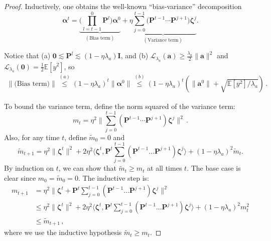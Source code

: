 \documentclass[11pt]{article}
\newcommand{\E}{\mathbb{E}}
\newcommand{\<}{\langle}
\renewcommand{\>}{\rangle}
\def\bzero{{\boldsymbol 0}}
\theoremstyle{definition}
\def\bI{{\boldsymbol I}}
\def\bP{{\boldsymbol P}}
\def\ba{{\boldsymbol a}}
\def\cL{{\mathcal L}}
\def\ba{{\boldsymbol a}}
\def\bP{{\boldsymbol P}}
\def\bzeta{{\boldsymbol \zeta}}
\def\balpha{{\boldsymbol \alpha}}
\begin{document}
\begin{proof}
Inductively, one obtains the well-known ``bias-variance'' decomposition $$\balpha^t = \underbrace{\Big(\prod_{l=t-1}^{0} \bP^l\Big) \balpha^0}_{(\mbox{Bias term})} + \underbrace{\eta \sum_{j=0}^{t-1} \Big(\bP^{t-1} \cdots \bP^{j+1} \Big) \bzeta^j}_{(\mbox{Variance term})}.$$

Notice that (a) $\bzero \lesssim \bP^l \lesssim (1 - \eta \lambda_a) \bI$, and (b) $\cL_{\lambda_a}(\ba) \geq \frac{\lambda_a}{2} \|\ba\|^2$ and $\cL_{\lambda_a}(\bzero) = \frac{1}{2} \E[y^2]$, so
\begin{align}\label{eq:bias-term-bound}
\|\mbox{(Bias term)}\| \stackrel{(a)}{\leq} (1 - \eta\lambda_a)^t \|\balpha^0\| \stackrel{(b)}{\leq} (1-\eta\lambda_a)^t(\|\ba^0\| + \sqrt{\E[y^2] / \lambda_a})\,.
\end{align}

To bound the variance term, define the norm squared of the variance term:
$$m_t = \eta^2\Big\|\sum_{j=0}^{t-1} \left(\bP^{t-1} \cdots \bP^{j+1} \right) \bzeta^j\Big\|^2\,.$$
Also, for any time $t$, define $\tilde{m}_0 = 0$ and $$\tilde{m}_{t+1} = \eta^2 \|\bzeta^t\|^2 + 2 \eta^2 \Big\<\bzeta^t, \bP^t \sum_{j=0}^{t-1} (\bP^{t-1} \dots \bP^{j+1}) \bzeta^j \Big\> + (1- \eta \lambda_a)^2 \tilde{m}_t.$$
By induction on $t$, we can show that $\tilde{m}_t \geq m_t$ at all times $t$. The base case is clear since $m_0 = \tilde{m}_0 = 0$. The inductive step is:
\begin{align*}
m_{t+1} &= \eta^2 \Big\|\bzeta^{t} + \bP^{t}\sum_{j=0}^{t-1} (\bP^{t-1} \dots \bP^{j+1}) \bzeta^j \Big\|^2 \\
&\leq \eta^2 \|\bzeta^t\|^2 + 2 \eta^2 \Big\<\bzeta^t, \bP^t \sum_{j=0}^{t-1} (\bP^{t-1} \dots \bP^{j+1}) \bzeta^j \Big\> + (1-\eta \lambda_a)^2 m_t^2 \\
&\leq \tilde{m}_{t+1}\,,
\end{align*}
where we use the inductive hypothesis $\tilde{m}_t \geq m_t$.


\end{proof}
\end{document}
